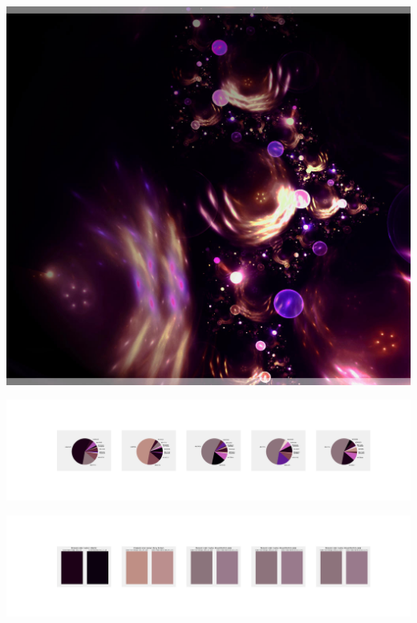 \documentclass[11pt]{article}
\begin{document}
\begin{landscape}
    \begin{center}
    \includegraphics[width=\textwidth]{./nbimg/file (138).jpg}
    \end{center}

    \begin{center}
    \includegraphics[width=250mm]{./nbimg/pie-43.jpg}
    \end{center}

    \begin{center}
    \includegraphics[width=250mm]{./nbimg/peak-43.jpg}
    \end{center}
    


\end{landscape}
\end{document}
